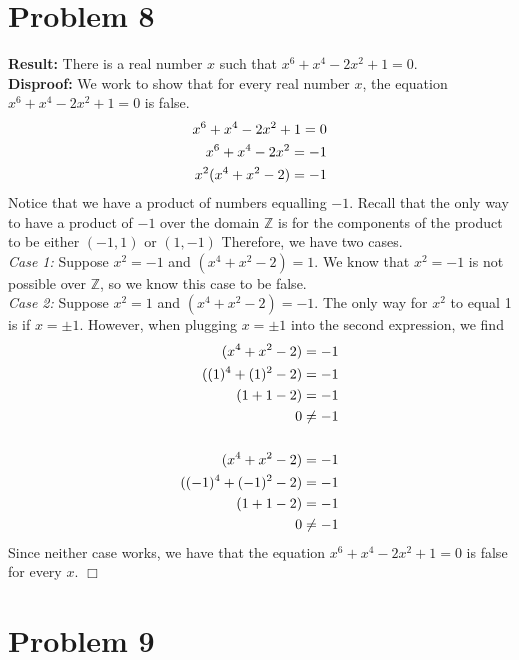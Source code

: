 \documentclass[11pt]{article}
\begin{document}
\section*{Problem 8}

    \textbf{Result:} There is a real number $x$ such that $x^6 + x^4 - 2x^2 + 1 = 0$.\\

    \textbf{Disproof:} We work to show that for every real number $x$, the equation $x^6 + x^4 - 2x^2 + 1 = 0$ is false.
    \begin{align}
        x^6 + x^4 - 2x^2 + 1 = 0 \notag \\
        x^6 + x^4 - 2x^2 = -1 \notag \\
        x^2(x^4 + x^2 -2) = -1 \notag
    \end{align}
    Notice that we have a product of numbers equalling $-1$. Recall that the only way to have a product of $-1$ over the domain $\mathbb{Z}$ is for the components of the product to be either $(-1, 1)$ or $(1, -1)$ Therefore, we have two cases. \\
    \textit{Case 1:} Suppose $x^2 = -1$ and $(x^4 + x^2 -2)=1$. We know that $x^2 = -1$ is not possible over $\mathbb{Z}$, so we know this case to be false. \\
    \textit{Case 2:} Suppose $x^2 = 1$ and $(x^4 + x^2 -2)=-1$. The only way for $x^2$ to equal 1 is if $x=\pm1$. However, when plugging $x=\pm1$ into the second expression, we find
    \begin{align}
        (x^4 + x^2 -2)=-1 \notag \\
        ((1)^4 + (1)^2 -2)=-1 \notag \\
        (1 + 1 -2)=-1 \notag \\
        0 \neq -1 \notag \\
        \notag \\
        (x^4 + x^2 -2)=-1 \notag \\
        ((-1)^4 + (-1)^2 -2)=-1 \notag \\
        (1 + 1 -2)=-1 \notag \\
        0 \neq -1 \notag 
    \end{align}
    Since neither case works, we have that the equation $x^6 + x^4 - 2x^2 + 1 = 0$ is false for every $x$. \hfill $\Box$

\newpage



\section*{Problem 9}
\end{document}
